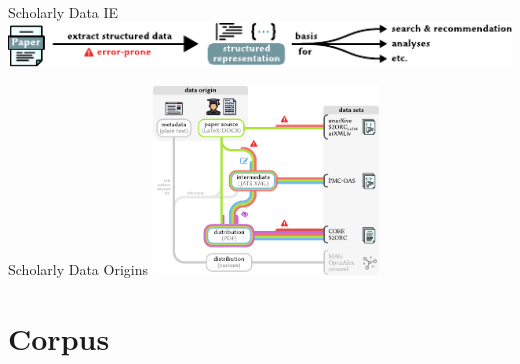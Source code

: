 \documentclass[en,16:9,smallfoot]{sdqbeamer}
\begin{document}
   \begin{frame}{Scholarly Data IE}
       \centering
       \includegraphics[width=\textwidth]{imgs/structured_representations_of_publucations}
   \end{frame}

   \begin{frame}{Scholarly Data Origins}
       \centering
       \includegraphics[width=0.45\textwidth]{imgs/scholarly_data_lifecycle_ystretch}
   \end{frame}

\section{Corpus}
\end{document}
